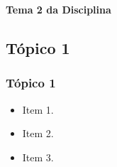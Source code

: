 {
  \begin{frame}[plain]%

    \vfill
    \centering

    \begin{block}{}
      \centering{}
      \Huge{\textbf{Tema 2 da Disciplina}}
    \end{block}

    \vfill

  \end{frame}
} %



\subsection[Tópico 1]{Tópico 1}\label{subsec:tema-2-topico-1}



\begin{frame}[t]\frametitle{Tópico 1}

  \begin{itemize}
    \justifying{}
    \setlength\itemsep{1em}
    \item Item 1.
    \item Item 2.
    \item Item 3.
  \end{itemize}

\end{frame}



